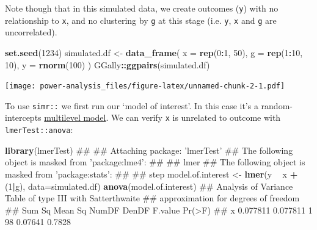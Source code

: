 \documentclass[]{article}
\newenvironment{Shaded}{\begin{snugshade}}{\end{snugshade}}
\newcommand{\KeywordTok}[1]{\textcolor[rgb]{0.13,0.29,0.53}{\textbf{#1}}}
\newcommand{\DataTypeTok}[1]{\textcolor[rgb]{0.13,0.29,0.53}{#1}}
\newcommand{\DecValTok}[1]{\textcolor[rgb]{0.00,0.00,0.81}{#1}}
\newcommand{\StringTok}[1]{\textcolor[rgb]{0.31,0.60,0.02}{#1}}
\newcommand{\OperatorTok}[1]{\textcolor[rgb]{0.81,0.36,0.00}{\textbf{#1}}}
\newcommand{\NormalTok}[1]{#1}
\theoremstyle{definition}
\theoremstyle{definition}
\theoremstyle{definition}
\theoremstyle{remark}
\begin{document}
Note though that in this simulated data, we create outcomes (\texttt{y})
with no relationship to \texttt{x}, and no clustering by \texttt{g} at
this stage (i.e. \texttt{y}, \texttt{x} and \texttt{g} are
uncorrelated).

\begin{Shaded}
\begin{Highlighting}[]
\KeywordTok{set.seed}\NormalTok{(}\DecValTok{1234}\NormalTok{)}
\NormalTok{simulated.df <-}\StringTok{ }\KeywordTok{data_frame}\NormalTok{(}
  \DataTypeTok{x =} \KeywordTok{rep}\NormalTok{(}\DecValTok{0}\OperatorTok{:}\DecValTok{1}\NormalTok{, }\DecValTok{50}\NormalTok{),}
  \DataTypeTok{g =} \KeywordTok{rep}\NormalTok{(}\DecValTok{1}\OperatorTok{:}\DecValTok{10}\NormalTok{, }\DecValTok{10}\NormalTok{),}
  \DataTypeTok{y =} \KeywordTok{rnorm}\NormalTok{(}\DecValTok{100}\NormalTok{)}
\NormalTok{)}
\NormalTok{GGally}\OperatorTok{::}\KeywordTok{ggpairs}\NormalTok{(simulated.df)}
\end{Highlighting}
\end{Shaded}

\texttt{[image: power-analysis\_files/figure-latex/unnamed-chunk-2-1.pdf]}

To use \texttt{simr::} we first run our `model of interest'. In this
case it's a random-intercepts
\protect\hyperlink{multilevel-models}{multilevel model}. We can verify
\texttt{x} is unrelated to outcome with \texttt{lmerTest::anova}:

\begin{Shaded}
\begin{Highlighting}[]
\KeywordTok{library}\NormalTok{(lmerTest)}
\NormalTok{## }
\NormalTok{## Attaching package: 'lmerTest'}
\NormalTok{## The following object is masked from 'package:lme4':}
\NormalTok{## }
\NormalTok{##     lmer}
\NormalTok{## The following object is masked from 'package:stats':}
\NormalTok{## }
\NormalTok{##     step}
\NormalTok{model.of.interest <-}\StringTok{ }\KeywordTok{lmer}\NormalTok{(y }\OperatorTok{~}\StringTok{ }\NormalTok{x }\OperatorTok{+}\StringTok{ }\NormalTok{(}\DecValTok{1}\OperatorTok{|}\NormalTok{g), }\DataTypeTok{data=}\NormalTok{simulated.df)}
\KeywordTok{anova}\NormalTok{(model.of.interest)}
\NormalTok{## Analysis of Variance Table of type III  with  Satterthwaite }
\NormalTok{## approximation for degrees of freedom}
\NormalTok{##     Sum Sq  Mean Sq NumDF DenDF F.value Pr(>F)}
\NormalTok{## x 0.077811 0.077811     1    98 0.07641 0.7828}
\end{Highlighting}
\end{Shaded}
\end{document}
